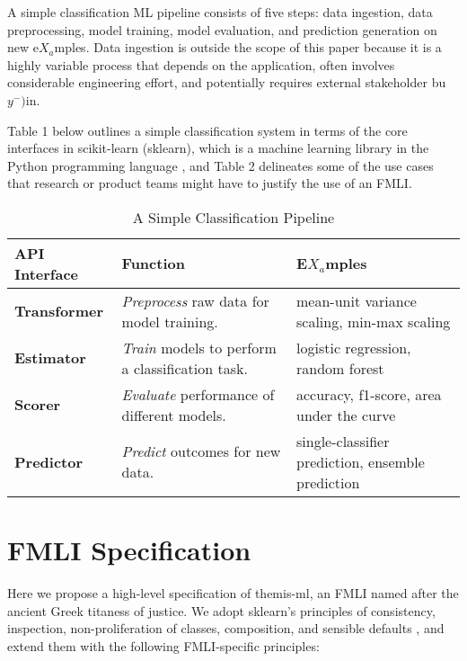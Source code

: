 \documentclass{acm_proc_article-sp}
\begin{document}
A simple classification ML pipeline consists of five steps: data ingestion, data
preprocessing, model training, model evaluation, and prediction generation on
new e\(X_a\)mples. Data ingestion is outside the scope of this paper because it is a
highly variable process that depends on the application, often involves
considerable engineering effort, and potentially requires external stakeholder
bu\(y^{-})\)in.

Table 1 below outlines a simple classification system in terms of the core
interfaces in scikit-learn (sklearn), which is a machine learning library in the
Python programming language \cite{buitinck2013api}, and Table 2 delineates some
of the use cases that research or product teams might have to justify the use of
an FMLI.


\begin{table}
  \caption{A Simple Classification Pipeline}
  \renewcommand{\arraystretch}{1.75}
  \small\noindent\begin{tabularx}{\linewidth}{l X X}
    \textbf{API Interface} & \textbf{Function} & \textbf{E\(X_a\)mples} \\
    \hline
    \textbf{Transformer} &
      \emph{Preprocess} raw data for model training. &
      mean-unit variance scaling, min-max scaling \\
    \textbf{Estimator} &
      \emph{Train} models to perform a classification task. &
      logistic regression, random forest \\
    \textbf{Scorer} &
      \emph{Evaluate} performance of different models. &
      accuracy, f1-score, area under the curve \\
    \textbf{Predictor} &
      \emph{Predict} outcomes for new data. &
      single-classifier prediction, ensemble prediction
  \end{tabularx}
\end{table}


\section{FMLI Specification} Here we propose a high-level specification of
themis-ml, an FMLI named after the ancient Greek titaness of justice. We adopt
sklearn's principles of consistency, inspection, non-proliferation of classes,
composition, and sensible defaults \cite{buitinck2013api}, and extend them with
the following FMLI-specific principles:
\end{document}

